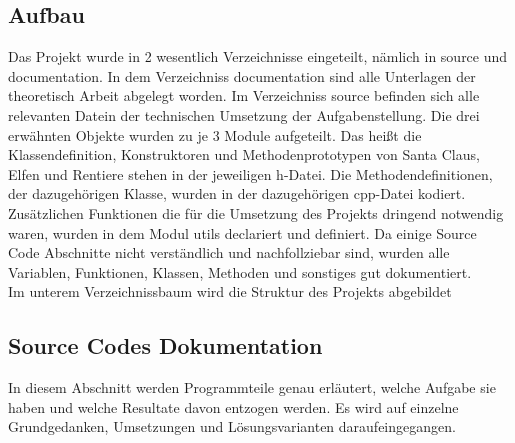 \documentclass[a4paper,12pt]{article}
\begin{document}
\subsection{Aufbau}
Das Projekt wurde in 2 wesentlich Verzeichnisse eingeteilt, nämlich in source und documentation. In dem Verzeichniss documentation sind alle Unterlagen der theoretisch Arbeit 
abgelegt worden. Im Verzeichniss source befinden sich alle relevanten Datein der technischen Umsetzung der Aufgabenstellung.
Die drei erwähnten Objekte wurden zu je 3 Module aufgeteilt.
Das heißt die Klassendefinition, Konstruktoren und Methodenprototypen von Santa Claus, Elfen und Rentiere stehen in der jeweiligen h-Datei. Die Methodendefinitionen, der dazugehörigen Klasse,
wurden in der dazugehörigen cpp-Datei kodiert. Zusätzlichen Funktionen die für die Umsetzung des Projekts dringend notwendig waren, wurden in dem Modul utils declariert und definiert.
Da einige Source Code Abschnitte nicht verständlich und nachfollziebar sind, wurden alle Variablen, Funktionen, Klassen, Methoden und sonstiges gut dokumentiert.\\
\newpage
Im unterem Verzeichnissbaum wird die Struktur des Projekts abgebildet
\\
\newpage
\subsection{Source Codes Dokumentation}
In diesem Abschnitt werden Programmteile genau erläutert, welche Aufgabe sie haben und welche Resultate davon entzogen werden.
Es wird auf einzelne Grundgedanken, Umsetzungen und Lösungsvarianten daraufeingegangen.
\end{document}
